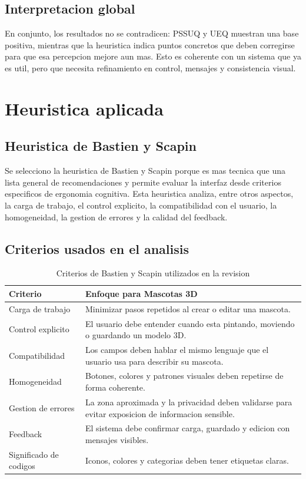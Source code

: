 \documentclass[12pt,a4paper]{article}
\begin{document}
\subsection{Interpretacion global}
En conjunto, los resultados no se contradicen: PSSUQ y UEQ muestran una base positiva, mientras que la heuristica indica puntos concretos que deben corregirse para que esa percepcion mejore aun mas. Esto es coherente con un sistema que ya es util, pero que necesita refinamiento en control, mensajes y consistencia visual.

\section{Heuristica aplicada}
\subsection{Heuristica de Bastien y Scapin}
Se selecciono la heuristica de Bastien y Scapin porque es mas tecnica que una lista general de recomendaciones y permite evaluar la interfaz desde criterios especificos de ergonomia cognitiva. Esta heuristica analiza, entre otros aspectos, la carga de trabajo, el control explicito, la compatibilidad con el usuario, la homogeneidad, la gestion de errores y la calidad del feedback.

\subsection{Criterios usados en el analisis}
\begin{table}[H]
\centering
\small
\begin{tabularx}{\textwidth}{@{}p{3.2cm}Y@{}}
\toprule
\textbf{Criterio} & \textbf{Enfoque para Mascotas 3D} \\
\midrule
Carga de trabajo & Minimizar pasos repetidos al crear o editar una mascota. \\
Control explicito & El usuario debe entender cuando esta pintando, moviendo o guardando un modelo 3D. \\
Compatibilidad & Los campos deben hablar el mismo lenguaje que el usuario usa para describir su mascota. \\
Homogeneidad & Botones, colores y patrones visuales deben repetirse de forma coherente. \\
Gestion de errores & La zona aproximada y la privacidad deben validarse para evitar exposicion de informacion sensible. \\
Feedback & El sistema debe confirmar carga, guardado y edicion con mensajes visibles. \\
Significado de codigos & Iconos, colores y categorias deben tener etiquetas claras. \\
\bottomrule
\end{tabularx}
\caption{Criterios de Bastien y Scapin utilizados en la revision}
\end{table}
\end{document}
